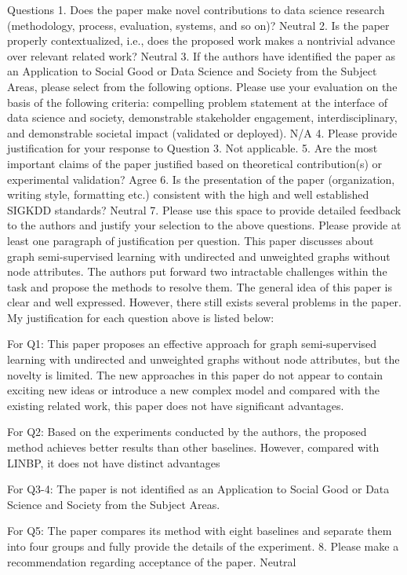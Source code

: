 Questions
1. Does the paper make novel contributions to data science research (methodology, process, evaluation, systems, and so on)?
Neutral
2. Is the paper properly contextualized, i.e., does the proposed work makes a nontrivial advance over relevant related work?
Neutral
3. If the authors have identified the paper as an Application to Social Good or Data Science and Society from the Subject Areas, please select from the following options. Please use your evaluation on the basis of the following criteria: compelling problem statement at the interface of data science and society, demonstrable stakeholder engagement, interdisciplinary, and demonstrable societal impact (validated or deployed).
N/A
4. Please provide justification for your response to Question 3.
Not applicable.
5. Are the most important claims of the paper justified based on theoretical contribution(s) or experimental validation?
Agree
6. Is the presentation of the paper (organization, writing style, formatting etc.) consistent with the high and well established SIGKDD standards?
Neutral
7. Please use this space to provide detailed feedback to the authors and justify your selection to the above questions. Please provide at least one paragraph of justification per question.
This paper discusses about graph semi-supervised learning with undirected and unweighted graphs without node attributes. The authors put forward two intractable challenges within the task and propose the methods to resolve them. The general idea of this paper is clear and well expressed. However, there still exists several problems in the paper. My justification for each question above is listed below:

For Q1: This paper proposes an effective approach for graph semi-supervised learning with undirected and unweighted graphs without node attributes, but the novelty is limited. The new approaches in this paper do not appear to contain exciting new ideas or introduce a new complex model and compared with the existing related work, this paper does not have significant advantages.

For Q2: Based on the experiments conducted by the authors, the proposed method achieves better results than other baselines. However, compared with LINBP, it does not have distinct advantages

For Q3-4: The paper is not identified as an Application to Social Good or Data Science and Society from the Subject Areas.

For Q5: The paper compares its method with eight baselines and
separate them into four groups and fully provide the details of the experiment.
8. Please make a recommendation regarding acceptance of the paper.
Neutral

